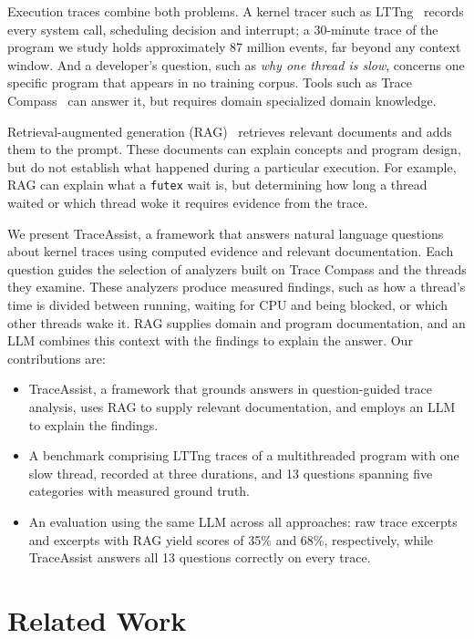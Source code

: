 \documentclass[10pt,conference]{IEEEtran}
\newcommand{\sysname}{TraceAssist\xspace}
\begin{document}
Execution traces combine both problems. A kernel tracer such as LTTng~\cite{desnoyers2006lttng} records every system call, scheduling decision and interrupt; a 30-minute trace of the program we study holds approximately 87 million events, far beyond any context window. And a developer's question, such as \textit{why one thread is slow}, concerns one specific program that appears in no training corpus. Tools such as Trace Compass~\cite{tracecompass} can answer it, but requires domain specialized domain knowledge. 

Retrieval-augmented generation (RAG)~\cite{lewis2020rag} retrieves relevant documents and adds them to the prompt. These documents can explain concepts and program design, but do not establish what happened during a particular execution. For example, RAG can explain what a \texttt{futex} wait is, but determining how long a thread waited or which thread woke it requires evidence from the trace.

We present \sysname, a framework that answers natural language questions about kernel traces using computed evidence and relevant documentation. Each question guides the selection of analyzers built on Trace Compass and the threads they examine. These analyzers produce measured findings, such as how a thread's time is divided between running, waiting for CPU and being blocked, or which other threads wake it. RAG supplies domain and program documentation, and an LLM combines this context with the findings to explain the answer.  Our contributions are:

\begin{itemize}
    \item \sysname, a framework that grounds answers in question-guided trace analysis, uses RAG to supply relevant documentation, and employs an LLM to explain the findings.
    \item A benchmark comprising LTTng traces of a multithreaded program with one slow thread, recorded at three durations, and 13 questions spanning five categories with measured ground truth.
    \item An evaluation using the same LLM across all approaches: raw trace excerpts and excerpts with RAG yield scores of 35\% and 68\%, respectively, while \sysname answers all 13 questions correctly on every trace.
\end{itemize}

\section{Related Work}
\end{document}
